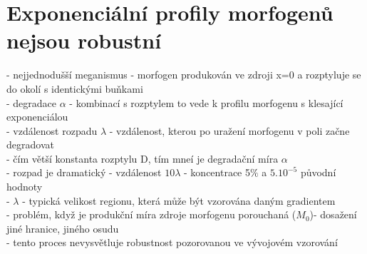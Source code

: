 \documentclass[11pt,a4paper]{report}
\begin{document}
\section{Exponenciální profily morfogenů nejsou robustní}
- nejjednodušší meganismus - morfogen produkován ve zdroji x=0 a rozptyluje se do okolí s identickými buňkami\\
- degradace $\alpha$ - kombinací s rozptylem to vede k profilu morfogenu s klesající exponenciálou\\
- vzdálenost rozpadu $\lambda$ - vzdálenost, kterou po uražení morfogenu v poli začne degradovat\\
- čím větší konstanta rozptylu D, tím mneí je degradační míra $\alpha$\\
- rozpad je dramatický - vzdálenost $10\lambda$ - koncentrace 5$\%$ a $5.10^{-5}$ původní hodnoty\\
- $\lambda$ - typická velikost regionu, která může být vzorována daným gradientem\\
- problém, když je produkční míra zdroje morfogenu porouchaná ($M_0$)- dosažení jiné hranice, jiného osudu\\
- tento proces nevysvětluje robustnost pozorovanou ve vývojovém vzorování\\
\end{document}
